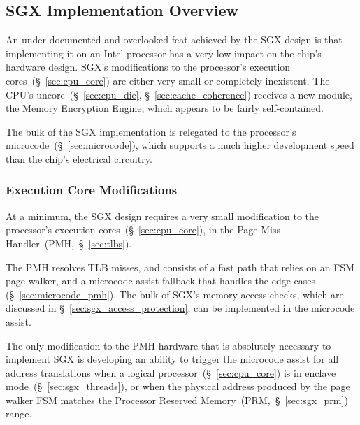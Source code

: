 \subsection{SGX Implementation Overview}
\label{sec:sgx_implementation_overview}

An under-documented and overlooked feat achieved by the SGX design is that
implementing it on an Intel processor has a very low impact on the chip's
hardware design. SGX's modifications to the processor's execution
cores~(\S~\ref{sec:cpu_core}) are either very small or completely inexistent.
The CPU's uncore~(\S~\ref{sec:cpu_die}, \S~\ref{sec:cache_coherence}) receives
a new module, the  Memory Encryption Engine, which appears to be fairly
self-contained.

The bulk of the SGX implementation is relegated to the processor's
microcode~(\S~\ref{sec:microcode}), which supports a much higher development
speed than the chip's electrical circuitry.


\subsubsection{Execution Core Modifications}
\label{sec:sgx_core_modifications}


At a minimum, the SGX design requires a very small modification to the
processor's execution cores~(\S~\ref{sec:cpu_core}), in the Page Miss
Handler~(PMH,~\S~\ref{sec:tlbs}).

The PMH resolves TLB misses, and consists of a fast path that relies on an FSM
page walker, and a microcode assist fallback that handles the edge cases
(\S~\ref{sec:microcode_pmh}). The bulk of SGX's memory access checks, which are
discussed in \S~\ref{sec:sgx_access_protection}, can be implemented in the
microcode assist.

The only modification to the PMH hardware that is absolutely necessary to
implement SGX is developing an ability to trigger the microcode assist for all
address translations when a logical processor~(\S~\ref{sec:cpu_core}) is in
enclave mode~(\S~\ref{sec:sgx_threads}), or when the physical address produced
by the page walker FSM matches the Processor Reserved
Memory~(PRM,~\S~\ref{sec:sgx_prm}) range.

